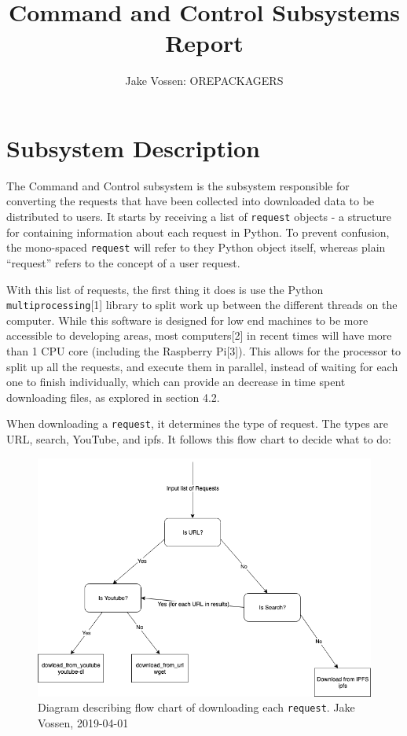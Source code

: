 \documentclass{article}
\begin{document}
\title{Command and Control Subsystems Report}
\author{Jake Vossen: OREPACKAGERS}

\maketitle


\section{Subsystem Description}
The Command and Control subsystem is the subsystem responsible for
converting the requests that have been collected into downloaded data
to be distributed to users. It starts by receiving a list of
\texttt{request} objects - a structure for containing information about
each request in Python. To prevent confusion, the mono-spaced \texttt{request}
will refer to they Python object itself, whereas plain ``request''
refers to the concept of a user request.

With this list of requests, the first thing it does is use the Python
\texttt{multiprocessing}[1] library to split work up between the
different threads on the computer. While this software is designed
for low end machines to be more accessible to developing areas, most
computers[2] in recent times will have more than 1 CPU core (including
the Raspberry Pi[3]). This allows for the processor to split up all
the requests, and execute them in parallel, instead of waiting for each
one to finish individually, which can provide an decrease in time
spent downloading files, as explored in section 4.2.

When downloading a \texttt{request}, it determines the type of
request. The types are URL, search, YouTube, and ipfs. It follows this
flow chart to decide what to do:

\begin{figure}[H]
  \centering
  \includegraphics[scale=.5]{log-flow-chart.png}
  \caption{\begingroup \fontsize{10pt}{12pt}\selectfont Diagram describing flow chart of downloading each
    \texttt{request}. Jake Vossen, 2019-04-01 \endgroup}
\end{figure}
\end{document}
